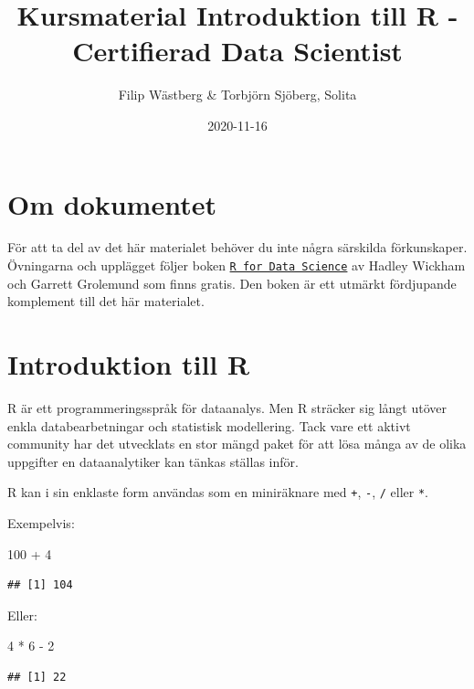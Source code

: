 \documentclass[
]{book}
\title{Kursmaterial Introduktion till R - Certifierad Data Scientist}
\author{Filip Wästberg \& Torbjörn Sjöberg, Solita}
\date{2020-11-16}
\newenvironment{Shaded}{\begin{snugshade}}{\end{snugshade}}
\newcommand{\DecValTok}[1]{\textcolor[rgb]{0.00,0.00,0.81}{#1}}
\newcommand{\SpecialCharTok}[1]{\textcolor[rgb]{0.00,0.00,0.00}{#1}}
\begin{document}
\maketitle

{
\setcounter{tocdepth}{1}
\tableofcontents
}
\hypertarget{om-dokumentet}{%
\chapter{Om dokumentet}\label{om-dokumentet}}

För att ta del av det här materialet behöver du inte några särskilda förkunskaper. Övningarna och upplägget följer boken \href{http://r4ds.had.co.nz/index.html}{\texttt{R\ for\ Data\ Science}} av Hadley Wickham och Garrett Grolemund som finns gratis. Den boken är ett utmärkt fördjupande komplement till det här materialet.

\hypertarget{intro}{%
\chapter{Introduktion till R}\label{intro}}

R är ett programmeringsspråk för dataanalys. Men R sträcker sig långt utöver enkla databearbetningar och statistisk modellering. Tack vare ett aktivt community har det utvecklats en stor mängd paket för att lösa många av de olika uppgifter en dataanalytiker kan tänkas ställas inför.

R kan i sin enklaste form användas som en miniräknare med \texttt{+}, \texttt{-}, \texttt{/} eller \texttt{*}.

Exempelvis:

\begin{Shaded}
\begin{Highlighting}[]
\DecValTok{100} \SpecialCharTok{+} \DecValTok{4}
\end{Highlighting}
\end{Shaded}

\begin{verbatim}
## [1] 104
\end{verbatim}

Eller:

\begin{Shaded}
\begin{Highlighting}[]
\DecValTok{4} \SpecialCharTok{*} \DecValTok{6} \SpecialCharTok{{-}} \DecValTok{2}
\end{Highlighting}
\end{Shaded}

\begin{verbatim}
## [1] 22
\end{verbatim}
\end{document}
